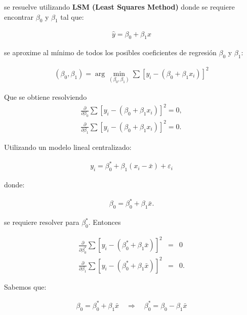 \documentclass[12pt]{article}
\begin{document}
se resuelve utilizando \textbf{LSM (Least Squares Method)} donde se requiere encontrar $\beta_0$ y $\beta_1$ tal que:

\begin{eqnarray*}
\hat{y} = \beta_0 + \beta_1 x
\end{eqnarray*}

se aproxime al mínimo de todos los posibles coeficientes de regresión $\beta_0$ y $\beta_1$:

\begin{eqnarray*}
(\beta_0, \beta_1) = \arg \min_{(\beta_0, \beta_1)} \sum \left[ y_i - (\beta_0 + \beta_1 x_i) \right]^2
\end{eqnarray*}

Que se obtiene resolviendo
\begin{eqnarray*}
\frac{\partial}{\partial \beta_0} \sum \left[ y_i - (\beta_0 + \beta_1 x_i) \right]^2 = 0,\\
\frac{\partial}{\partial \beta_1} \sum \left[ y_i - (\beta_0 + \beta_1 x_i) \right]^2 = 0.
\end{eqnarray*}

Utilizando un modelo lineal centralizado:

\begin{eqnarray*}
y_i = \beta_0^* + \beta_1 (x_i - \bar{x}) + \varepsilon_i
\end{eqnarray*}

donde:

\begin{eqnarray*}
\beta_0 = \beta_0^* + \beta_1 \bar{x}.
\end{eqnarray*}

se requiere resolver para $\beta_0^*$. Entonces

\begin{eqnarray*}
\frac{\partial}{\partial \beta_0^*} \sum \left[ y_i - (\beta_0^* + \beta_1 \bar{x}) \right]^2 &=& 0\\
\frac{\partial}{\partial \beta_1} \sum \left[ y_i - (\beta_0^* + \beta_1 \bar{x}) \right]^2&=& 0.
\end{eqnarray*}

Sabemos que:

\begin{eqnarray*}
\beta_0 = \beta_0^* + \beta_1 \bar{x} \quad \Rightarrow \quad \beta_0^* = \beta_0 - \beta_1 \bar{x}
\end{eqnarray*}
\end{document}
